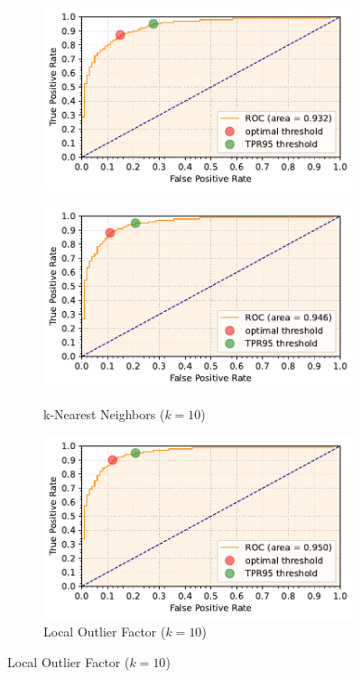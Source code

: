 \begin{figure}[t]
\begin{subfigure}[b]{0.495\textwidth}
        \includegraphics[width=\textwidth]{images/distributions/rocs/roc-distributions-dimension_250-samples_1000-distance_8-distribution_gaussian-model_IRWD-1000-seed_0.pdf}
        \label{fig:roc-irwd}
    \end{subfigure}
    \hfill
    \begin{subfigure}[b]{0.495\textwidth}
        \centering
        \caption{\small k-Nearest Neighbors ($k=10$)}
        \includegraphics[width=\textwidth]{images/distributions/rocs/roc-distributions-dimension_250-samples_1000-distance_8-distribution_gaussian-model_kNN-10-seed_0.pdf}
        \label{fig:roc-knn}
    \end{subfigure}
    \begin{subfigure}[b]{0.495\textwidth}
        \centering
        \caption{\small Local Outlier Factor ($k=10$)}
        \includegraphics[width=\textwidth]{images/distributions/rocs/roc-distributions-dimension_250-samples_1000-distance_8-distribution_gaussian-model_LOF-10-seed_0.pdf}

\end{subfigure}
\end{figure}
